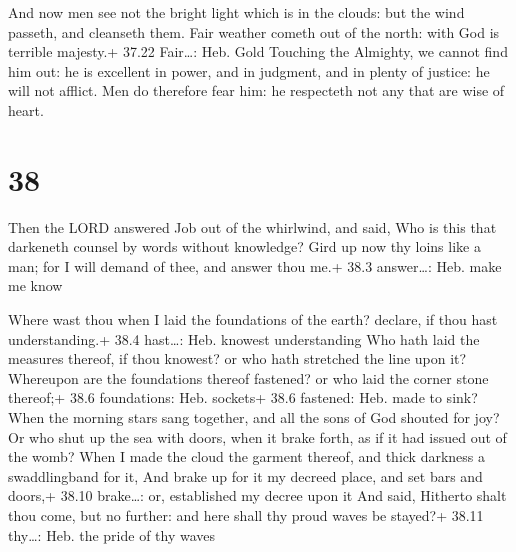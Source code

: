  And now men see not the bright light which is in the
clouds: but the wind passeth, and cleanseth them.  Fair
weather cometh out of the north: with God is terrible majesty.+ 37.22
Fair\ldots: Heb. Gold  Touching the Almighty, we cannot
find him out: he is excellent in power, and in judgment, and in plenty
of justice: he will not afflict.  Men do therefore fear
him: he respecteth not any that are wise of heart.

\hypertarget{section-37}{%
\section{38}\label{section-37}}

 Then the LORD answered Job out of the whirlwind, and said,
 Who is this that darkeneth counsel by words without
knowledge?  Gird up now thy loins like a man; for I will
demand of thee, and answer thou me.+ 38.3 answer\ldots: Heb. make me
know

 Where wast thou when I laid the foundations of the earth?
declare, if thou hast understanding.+ 38.4 hast\ldots: Heb. knowest
understanding  Who hath laid the measures thereof, if thou
knowest? or who hath stretched the line upon it?  Whereupon
are the foundations thereof fastened? or who laid the corner stone
thereof;+ 38.6 foundations: Heb. sockets+ 38.6 fastened: Heb. made to
sink?  When the morning stars sang together, and all the
sons of God shouted for joy?  Or who shut up the sea with
doors, when it brake forth, as if it had issued out of the womb?
 When I made the cloud the garment thereof, and thick
darkness a swaddlingband for it,  And brake up for it my
decreed place, and set bars and doors,+ 38.10 brake\ldots: or,
established my decree upon it  And said, Hitherto shalt
thou come, but no further: and here shall thy proud waves be stayed?+
38.11 thy\ldots: Heb. the pride of thy waves

